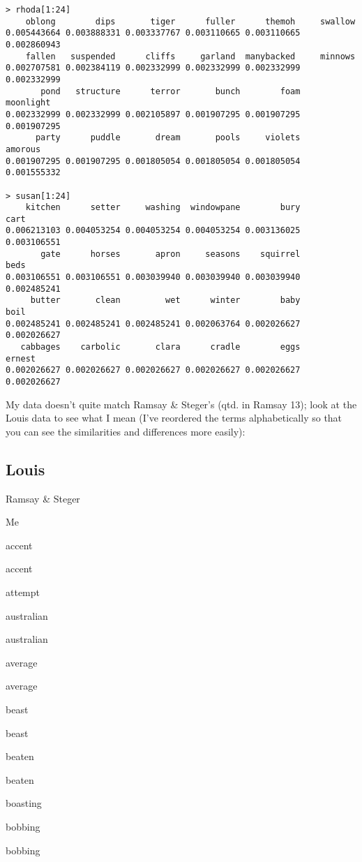 \documentclass[
  12pt,
]{article}
\begin{document}
\begin{verbatim}
> rhoda[1:24]
    oblong        dips       tiger      fuller      themoh     swallow 
0.005443664 0.003888331 0.003337767 0.003110665 0.003110665 0.002860943 
    fallen   suspended      cliffs     garland  manybacked     minnows 
0.002707581 0.002384119 0.002332999 0.002332999 0.002332999 0.002332999 
       pond   structure      terror       bunch        foam   moonlight 
0.002332999 0.002332999 0.002105897 0.001907295 0.001907295 0.001907295 
      party      puddle       dream       pools     violets     amorous 
0.001907295 0.001907295 0.001805054 0.001805054 0.001805054 0.001555332 

> susan[1:24]
    kitchen      setter     washing  windowpane        bury        cart 
0.006213103 0.004053254 0.004053254 0.004053254 0.003136025 0.003106551 
       gate      horses       apron     seasons    squirrel        beds 
0.003106551 0.003106551 0.003039940 0.003039940 0.003039940 0.002485241 
     butter       clean         wet      winter        baby        boil 
0.002485241 0.002485241 0.002485241 0.002063764 0.002026627 0.002026627 
   cabbages    carbolic       clara      cradle        eggs      ernest 
0.002026627 0.002026627 0.002026627 0.002026627 0.002026627 0.002026627 
\end{verbatim}

My data doesn't quite match Ramsay \& Steger's (qtd. in Ramsay 13); look
at the Louis data to see what I mean (I've reordered the terms
alphabetically so that you can see the similarities and differences more
easily):

\hypertarget{louis}{%
\subsection{Louis}\label{louis}}

Ramsay \& Steger

Me

accent

accent

attempt

australian

australian

average

average

beast

beast

beaten

beaten

boasting

bobbing

bobbing
\end{document}
